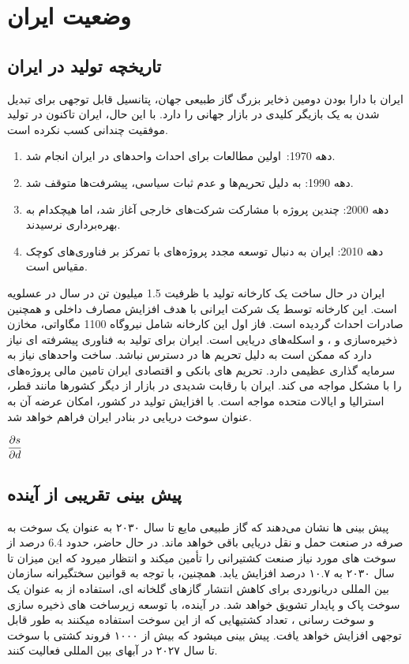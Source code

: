 \section{وضعیت ایران}
\subsection{تاریخچه تولید  در ایران}
ایران با دارا بودن دومین ذخایر بزرگ گاز طبیعی جهان، پتانسیل قابل توجهی برای تبدیل شدن به یک بازیگر کلیدی در بازار  جهانی را دارد. با این حال، ایران تاکنون در تولید  موفقیت چندانی کسب نکرده است.
\begin{enumerate}
	\item دهه 1970: اولین مطالعات برای احداث واحدهای  در ایران انجام شد.
	\item دهه 1990: به دلیل تحریم‌ها و عدم ثبات سیاسی، پیشرفت‌ها متوقف شد.
	\item دهه 2000: چندین پروژه  با مشارکت شرکت‌های خارجی آغاز شد، اما هیچکدام به بهره‌برداری نرسیدند.
	\item دهه 2010: ایران به دنبال توسعه مجدد پروژه‌های  با تمرکز بر فناوری‌های کوچک مقیاس است.
\end{enumerate}
ایران در حال ساخت یک کارخانه تولید  با ظرفیت 1.5 میلیون تن در سال در عسلویه است. این کارخانه توسط یک شرکت ایرانی با هدف افزایش مصارف داخلی و همچنین صادرات احداث گردیده است. فاز اول این کارخانه شامل نیروگاه 1100 مگاواتی، مخازن ذخیره‌سازی  و ، و اسکله‌های دریایی است. 
ایران برای تولید  به فناوری پیشرفته ای نیاز دارد که ممکن است به دلیل تحریم ها در دسترس نباشد. ساخت واحدهای  نیاز به سرمایه گذاری عظیمی دارد. تحریم های بانکی و اقتصادی ایران تامین مالی پروژه‌های  را با مشکل مواجه می کند. ایران با رقابت شدیدی در بازار  از دیگر کشورها مانند قطر، استرالیا و ایالات متحده مواجه است.
با افزایش تولید  در کشور، امکان عرضه آن به عنوان سوخت دریایی در بنادر ایران فراهم خواهد شد.

$\displaystyle\frac{\partial s}{\partial d}$
\subsection{پیش بینی تقریبی از آینده}
پیش بینی ها نشان می‌دهند که گاز طبیعی مایع  تا سال ۲۰۳۰ به عنوان یک سوخت به صرفه در صنعت حمل و نقل دریایی باقی خواهد ماند. در حال حاضر،   حدود 6.4 درصد از سوخت های مورد نیاز صنعت کشتیرانی را تأمین میکند و انتظار میرود که این میزان تا سال ۲۰۳۰ به ۱۰.۷ درصد افزایش یابد.
همچنین، با توجه به قوانین سختگیرانه سازمان بین المللی دریانوردی  برای کاهش انتشار گازهای     گلخانه ای، استفاده از  به عنوان یک سوخت پاک و پایدار تشویق خواهد شد.
در آینده، با توسعه زیرساخت های ذخیره سازی و سوخت رسانی ، تعداد کشتیهایی که از این سوخت استفاده میکنند به طور قابل توجهی افزایش خواهد یافت. پیش بینی میشود که بیش از ۱۰۰۰ فروند کشتی با سوخت  تا سال ۲۰۲۷ در آبهای بین المللی فعالیت کنند.
